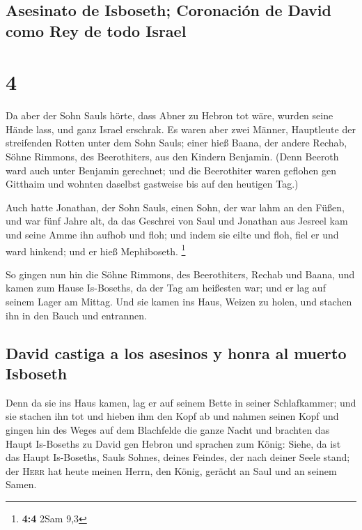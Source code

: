 \hypertarget{asesinato-de-isboseth-coronaciuxf3n-de-david-como-rey-de-todo-israel}{%
\subsection{Asesinato de Isboseth; Coronación de David como Rey de todo
Israel}\label{asesinato-de-isboseth-coronaciuxf3n-de-david-como-rey-de-todo-israel}}

\hypertarget{section-3}{%
\section{4}\label{section-3}}

 Da aber der Sohn Sauls hörte, dass Abner zu Hebron tot
wäre, wurden seine Hände lass, und ganz Israel erschrak. 
Es waren aber zwei Männer, Hauptleute der streifenden Rotten unter dem
Sohn Sauls; einer hieß Baana, der andere Rechab, Söhne Rimmons, des
Beerothiters, aus den Kindern Benjamin. (Denn Beeroth ward auch unter
Benjamin gerechnet;  und die Beerothiter waren geflohen
gen Gitthaim und wohnten daselbst gastweise bis auf den heutigen Tag.)

 Auch hatte Jonathan, der Sohn Sauls, einen Sohn, der war
lahm an den Füßen, und war fünf Jahre alt, da das Geschrei von Saul und
Jonathan aus Jesreel kam und seine Amme ihn aufhob und floh; und indem
sie eilte und floh, fiel er und ward hinkend; und er hieß Mephiboseth.
\footnote{\textbf{4:4} 2Sam 9,3}

 So gingen nun hin die Söhne Rimmons, des Beerothiters,
Rechab und Baana, und kamen zum Hause Is-Boseths, da der Tag am
heißesten war; und er lag auf seinem Lager am Mittag.  Und
sie kamen ins Haus, Weizen zu holen, und stachen ihn in den Bauch und
entrannen.

\hypertarget{david-castiga-a-los-asesinos-y-honra-al-muerto-isboseth}{%
\subsection{David castiga a los asesinos y honra al muerto
Isboseth}\label{david-castiga-a-los-asesinos-y-honra-al-muerto-isboseth}}

 Denn da sie ins Haus kamen, lag er auf seinem Bette in
seiner Schlafkammer; und sie stachen ihn tot und hieben ihm den Kopf ab
und nahmen seinen Kopf und gingen hin des Weges auf dem Blachfelde die
ganze Nacht  und brachten das Haupt Is-Boseths zu David
gen Hebron und sprachen zum König: Siehe, da ist das Haupt Is-Boseths,
Sauls Sohnes, deines Feindes, der nach deiner Seele stand; der
\textsc{Herr} hat heute meinen Herrn, den König, gerächt an Saul und an
seinem Samen.

